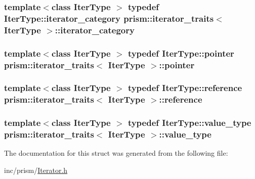 \subsubsection[{\texorpdfstring{iterator\+\_\+category}{iterator_category}}]{\setlength{\rightskip}{0pt plus 5cm}template$<$class Iter\+Type $>$ typedef Iter\+Type\+::iterator\+\_\+category {\bf prism\+::iterator\+\_\+traits}$<$ Iter\+Type $>$\+::{\bf iterator\+\_\+category}}\hypertarget{structprism_1_1iterator__traits_a2e20906a677a5a465bf343ff4281a010}{}\label{structprism_1_1iterator__traits_a2e20906a677a5a465bf343ff4281a010}
\subsubsection[{\texorpdfstring{pointer}{pointer}}]{\setlength{\rightskip}{0pt plus 5cm}template$<$class Iter\+Type $>$ typedef Iter\+Type\+::pointer {\bf prism\+::iterator\+\_\+traits}$<$ Iter\+Type $>$\+::{\bf pointer}}\hypertarget{structprism_1_1iterator__traits_a5ec4c84886d15b5efa1bb3fd0984dd71}{}\label{structprism_1_1iterator__traits_a5ec4c84886d15b5efa1bb3fd0984dd71}
\subsubsection[{\texorpdfstring{reference}{reference}}]{\setlength{\rightskip}{0pt plus 5cm}template$<$class Iter\+Type $>$ typedef Iter\+Type\+::reference {\bf prism\+::iterator\+\_\+traits}$<$ Iter\+Type $>$\+::{\bf reference}}\hypertarget{structprism_1_1iterator__traits_af4ddc7a938960bb8c558e6eae9ee1548}{}\label{structprism_1_1iterator__traits_af4ddc7a938960bb8c558e6eae9ee1548}
\subsubsection[{\texorpdfstring{value\+\_\+type}{value_type}}]{\setlength{\rightskip}{0pt plus 5cm}template$<$class Iter\+Type $>$ typedef Iter\+Type\+::value\+\_\+type {\bf prism\+::iterator\+\_\+traits}$<$ Iter\+Type $>$\+::{\bf value\+\_\+type}}\hypertarget{structprism_1_1iterator__traits_a764c6740051f048bb81ba63d993e96cd}{}\label{structprism_1_1iterator__traits_a764c6740051f048bb81ba63d993e96cd}


The documentation for this struct was generated from the following file\+:\begin{DoxyCompactItemize}
\item 
inc/prism/\hyperlink{_iterator_8h}{Iterator.\+h}\end{DoxyCompactItemize}
